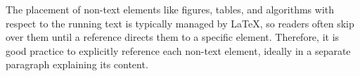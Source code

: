 


\noindent The placement of non-text elements like figures, tables, and algorithms with respect to the running text is typically managed by \LaTeX{}, so readers often skip over them until a reference directs them to a specific element.
Therefore, it is good practice to explicitly reference each non-text element, ideally in a separate paragraph explaining its content.
